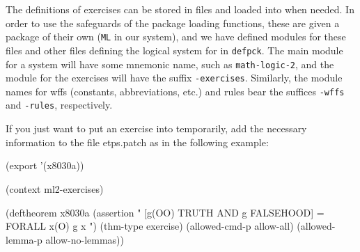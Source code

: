 The definitions of exercises can be stored in files and loaded into {\TPS}
when needed. In order to use the safeguards of the {\TPS} package loading
functions, these are given a package of their own ({\tt ML} in our system),
and we have defined modules for these files and other files
defining the logical system for {\ETPS} in {\tt defpck}. The main module
for a system will have some mnemonic name, such as {\tt math-logic-2},
and the module for the exercises will have the suffix {\tt -exercises}.
Similarly, the module names for wffs (constants, abbreviations, etc.)
and rules bear the suffices {\tt -wffs} and {\tt -rules}, respectively.

If you just want to put an exercise into {\ETPS} temporarily, add the
necessary information to the file etps.patch as in the following
example:

\begin{tpsexample}
(export '(x8030a))

(context ml2-exercises)

(deftheorem x8030a
  (assertion
"
[g(OO) TRUTH AND g FALSEHOOD] = FORALL x(O) g x
  ")
  (thm-type exercise)
  (allowed-cmd-p allow-all)
  (allowed-lemma-p allow-no-lemmas))


\end{tpsexample}
